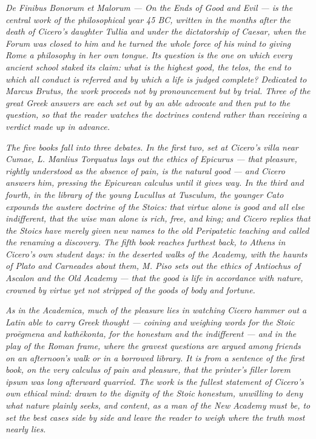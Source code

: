 
\textit{\textit{De Finibus Bonorum et Malorum} --- On the Ends of Good
and Evil --- is the central work of the philosophical year 45 BC,
written in the months after the death of Cicero's daughter Tullia and
under the dictatorship of Caesar, when the Forum was closed to him and
he turned the whole force of his mind to giving Rome a philosophy in
her own tongue. Its question is the one on which every ancient school
staked its claim: what is the highest good, the \textit{telos}, the end
to which all conduct is referred and by which a life is judged complete?
Dedicated to Marcus Brutus, the work proceeds not by pronouncement but
by trial. Three of the great Greek answers are each set out by an able
advocate and then put to the question, so that the reader watches the
doctrines contend rather than receiving a verdict made up in advance.}

\textit{The five books fall into three debates. In the first two, set
at Cicero's villa near Cumae, L. Manlius Torquatus lays out the ethics
of Epicurus --- that pleasure, rightly understood as the absence of
pain, is the natural good --- and Cicero answers him, pressing the
Epicurean calculus until it gives way. In the third and fourth, in the
library of the young Lucullus at Tusculum, the younger Cato expounds the
austere doctrine of the Stoics: that virtue alone is good and all else
indifferent, that the wise man alone is rich, free, and king; and
Cicero replies that the Stoics have merely given new names to the old
Peripatetic teaching and called the renaming a discovery. The fifth
book reaches furthest back, to Athens in Cicero's own student days: in
the deserted walks of the Academy, with the haunts of Plato and
Carneades about them, M. Piso sets out the ethics of Antiochus of
Ascalon and the Old Academy --- that the good is life in accordance
with nature, crowned by virtue yet not stripped of the goods of body
and fortune.}

\textit{As in the \textit{Academica}, much of the pleasure lies in
watching Cicero hammer out a Latin able to carry Greek thought ---
coining and weighing words for the Stoic \textit{proēgmena} and
\textit{kathēkonta}, for the \textit{honestum} and the indifferent ---
and in the play of the Roman frame, where the gravest questions are
argued among friends on an afternoon's walk or in a borrowed library.
It is from a sentence of the first book, on the very calculus of pain
and pleasure, that the printer's filler \textit{lorem ipsum} was long
afterward quarried. The work is the fullest statement of Cicero's own
ethical mind: drawn to the dignity of the Stoic \textit{honestum},
unwilling to deny what nature plainly seeks, and content, as a man of
the New Academy must be, to set the best cases side by side and leave
the reader to weigh where the truth most nearly lies.}
